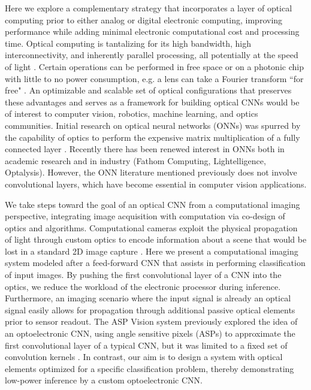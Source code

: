 \documentclass[fleqn,10pt]{wlscirep}
\begin{document}
Here we explore a complementary strategy that incorporates a layer of optical computing prior to either analog or digital electronic computing, improving performance while adding minimal electronic computational cost and processing time. Optical computing is tantalizing for its high bandwidth, high interconnectivity, and inherently parallel processing, all potentially at the speed of light \cite{denz2013optical}. Certain operations can be performed in free space or on a photonic chip with little to no power consumption, e.g. a lens can take a Fourier transform ``for free" \cite{yang2013chip,goodman2008introduction}.  An optimizable and scalable set of optical configurations that preserves these advantages and serves as a framework for building optical CNNs would be of interest to computer vision, robotics, machine learning, and optics communities. Initial research on optical neural networks (ONNs) was spurred by the capability of optics to perform the expensive matrix multiplication of a fully connected layer \cite{farhat1985optical,psaltis1988adaptive,lu1989two,saxena1995adaptive}. Recently there has been renewed interest in ONNs both in academic research \cite{shen2017deep,bueno2017reinforcement} and in industry (Fathom Computing, Lightelligence, Optalysis). However, the ONN literature mentioned previously does not involve convolutional layers, which have become essential in computer vision applications. 

We take steps toward the goal of an optical CNN from a computational imaging perspective, integrating image acquisition with computation via co-design of optics and algorithms. Computational cameras exploit the physical propagation of light through custom optics to encode information about a scene that would be lost in a standard 2D image capture \cite{ng2005light,levin2007image,mcguire2007optical,o2010optical,chang2016variable}. Here we present a computational imaging system modeled after a feed-forward CNN that assists in performing classification of input images. By pushing the first convolutional layer of a CNN into the optics, we reduce the workload of the electronic processor during inference. Furthermore, an imaging scenario where the input signal is already an optical signal easily allows for propagation through additional passive optical elements prior to sensor readout. The ASP Vision system previously explored the idea of an optoelectronic CNN, using angle sensitive pixels (ASPs) to approximate the first convolutional layer of a typical CNN, but it was limited to a fixed set of convolution kernels \cite{chen2016asp}. In contrast, our aim is to design a system with optical elements optimized for a specific classification problem, thereby demonstrating low-power inference by a custom optoelectronic CNN.
\end{document}
